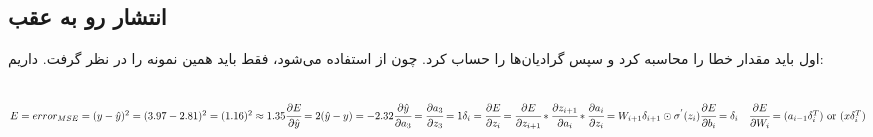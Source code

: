 \subsection{انتشار رو به عقب}
اول باید مقدار خطا را محاسبه کرد و سپس گرادیان‌ها را حساب کرد. چون از 
استفاده می‌شود، فقط باید همین نمونه را در نظر گرفت. داریم:
\begin{latin}
	~\\
	$
	E = error_{MSE} = (y - \hat{y})^2 = (3.97 - 2.81)^2 = (1.16)^2 \approx 1.35
	\\
	\cfrac{\partial E}{\partial \hat{y}} = 2 (\hat{y}  - y)  = -2.32 
	\\
	\cfrac{\partial \hat{y}}{\partial a_3} = \cfrac{\partial a_3}{\partial z_3} = 1
	\\
	\delta_i = \cfrac{\partial E}{\partial z_i} = 
	\cfrac{\partial E}{\partial z_{i + 1}} * \cfrac{\partial z_{i + 1}}{\partial a_i} * \cfrac{\partial a_{i}}{\partial z_i} 
	= 
	 W_{i + 1} \delta_{i + 1}  \odot \sigma^{'} (z_i) 
	\\
	\cfrac{\partial E}{\partial b_i} = \delta_i 
	\quad 
	\cfrac{\partial E}{\partial W_i} = (  a_{i - 1} \delta_i^T ) \text{ or }( x \delta_i^T)
	$
\end{latin}
